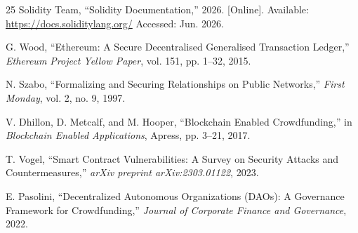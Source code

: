 \documentclass[12pt]{article}
\begin{document}
\begin{thebibliography}{25}
Solidity Team, ``Solidity Documentation,'' 2026. [Online]. Available: \url{https://docs.soliditylang.org/} Accessed: Jun. 2026.

G. Wood, ``Ethereum: A Secure Decentralised Generalised Transaction Ledger,'' \textit{Ethereum Project Yellow Paper}, vol. 151, pp. 1--32, 2015.

N. Szabo, ``Formalizing and Securing Relationships on Public Networks,'' \textit{First Monday}, vol. 2, no. 9, 1997.

V. Dhillon, D. Metcalf, and M. Hooper, ``Blockchain Enabled Crowdfunding,'' in \textit{Blockchain Enabled Applications}, Apress, pp. 3--21, 2017.

T. Vogel, ``Smart Contract Vulnerabilities: A Survey on Security Attacks and Countermeasures,'' \textit{arXiv preprint arXiv:2303.01122}, 2023.

E. Pasolini, ``Decentralized Autonomous Organizations (DAOs): A Governance Framework for Crowdfunding,'' \textit{Journal of Corporate Finance and Governance}, 2022.

\end{thebibliography}
\end{document}
